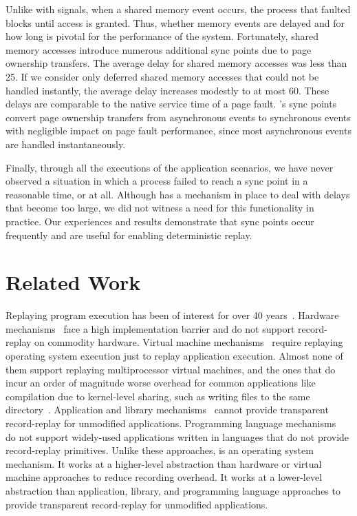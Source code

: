 \begin{table}[]
Unlike with signals, when a shared memory event occurs, the process
that faulted blocks until access is granted. Thus, whether memory
events are delayed and for how long is pivotal for the performance of
the system. Fortunately, shared memory accesses introduce numerous
additional sync points due to page ownership transfers. The average
delay for shared memory accesses was less than 25\us{}. If we consider
only deferred shared memory accesses that could not be handled
instantly, the average delay increases modestly to at most 60\us{}.
These delays are comparable to the native service time of a page
fault. \scribe{}'s sync points convert page ownership transfers from
asynchronous events to synchronous events with negligible impact on
page fault performance, since most asynchronous events are handled
instantaneously.

Finally, through all the executions of the application scenarios,
we have never observed a situation in which a process failed to reach a sync
point in a reasonable time, or at all.  Although \scribe{} has a 
mechanism in place to deal with delays that become too large, we did
not witness a need for this functionality in practice.  
Our experiences and results demonstrate that sync points occur
frequently and are useful for enabling deterministic replay.

\section{Related Work}
\label{scribe:sec:related}

Replaying program execution has been of interest for over 40
years~\cite{exdams}.  Hardware
mechanisms~\cite{hwrr,dmp,rerun,delorean,capo,strata,bugnet,fdr}
face a high implementation barrier and do not support record-replay on
commodity hardware.  Virtual machine
mechanisms~\cite{bressoud,revirt,smp-revirt,vmware}
require replaying operating system execution just to replay
application execution.  Almost none of them support replaying
multiprocessor virtual machines, and the ones that do incur an order
of magnitude worse overhead for common applications like
compilation due to kernel-level sharing, such as writing files to the
same directory~\cite{smp-revirt}.  Application and 
library mechanisms~\cite{liblog,r2:osdi,kendo,jockey} cannot provide
transparent record-replay for unmodified applications.  Programming
language mechanisms~\cite{dejavu,instant-replay,replay-pldi} do not
support widely-used applications written in languages that do not
provide record-replay primitives.  Unlike these approaches, \scribe{}
is an operating system mechanism.  It works at a higher-level
abstraction than hardware or virtual machine approaches to reduce
recording overhead.  It works at a lower-level abstraction than
application, library, and programming language approaches to provide
transparent record-replay for unmodified applications.


\end{table}
